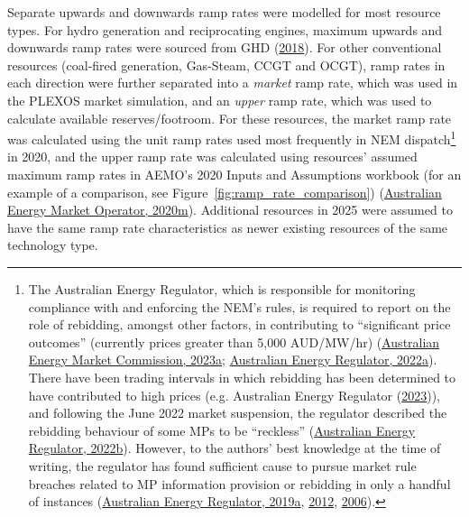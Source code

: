 \documentclass[12pt,a4paper,]{report}
\begin{document}
Separate upwards and downwards ramp rates were modelled for most
resource types. For hydro generation and reciprocating engines, maximum
upwards and downwards ramp rates were sourced from GHD
(\protect\hyperlink{ref-ghd2018AEMOCost2018}{2018}). For other
conventional resources (coal-fired generation, Gas-Steam, CCGT and
OCGT), ramp rates in each direction were further separated into a
\emph{market} ramp rate, which was used in the PLEXOS market simulation,
and an \emph{upper} ramp rate, which was used to calculate available
reserves/footroom. For these resources, the market ramp rate was
calculated using the unit ramp rates used most frequently in NEM
dispatch\footnote{The Australian Energy Regulator, which is responsible
  for monitoring compliance with and enforcing the NEM's rules, is
  required to report on the role of rebidding, amongst other factors, in
  contributing to ``significant price outcomes'' (currently prices
  greater than 5,000 AUD/MW/hr)
  (\protect\hyperlink{ref-australianenergymarketcommissionNationalElectricityRules2023a}{Australian
  Energy Market Commission, 2023a};
  \protect\hyperlink{ref-australianenergyregulatorSignificantPriceReporting2022}{Australian
  Energy Regulator, 2022a}). There have been trading intervals in which
  rebidding has been determined to have contributed to high prices (e.g.
  Australian Energy Regulator
  (\protect\hyperlink{ref-australianenergyregulatorElectricityPrices0002023}{2023})),
  and following the June 2022 market suspension, the regulator described
  the rebidding behaviour of some MPs to be ``reckless''
  (\protect\hyperlink{ref-australianenergyregulatorJune2022Market2022}{Australian
  Energy Regulator, 2022b}). However, to the authors' best knowledge at
  the time of writing, the regulator has found sufficient cause to
  pursue market rule breaches related to MP information provision or
  rebidding in only a handful of instances
  (\protect\hyperlink{ref-australianenergyregulatorPelicanPointPower2019}{Australian
  Energy Regulator, 2019a},
  \protect\hyperlink{ref-australianenergyregulatorQueenslandGeneratorStanwell2012}{2012},
  \protect\hyperlink{ref-australianenergyregulatorInfringementNoticeAGL2006}{2006}).}
in 2020, and the upper ramp rate was calculated using resources' assumed
maximum ramp rates in AEMO's 2020 Inputs and Assumptions workbook (for
an example of a comparison, see Figure~\ref{fig:ramp_rate_comparison})
(\protect\hyperlink{ref-australianenergymarketoperator2020InputsAssumptions2020}{Australian
Energy Market Operator, 2020m}). Additional resources in 2025 were
assumed to have the same ramp rate characteristics as newer existing
resources of the same technology type.
\end{document}
